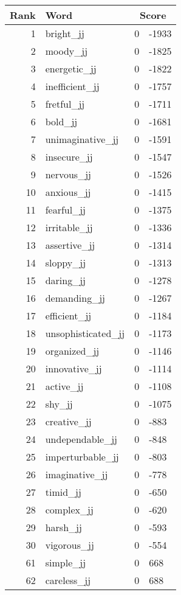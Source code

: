 \begin{longtable}[!htbp]{| rlr@{.}l |}
    \hline
    \textbf{Rank} & \textbf{Word} & \multicolumn{2}{c|}{\textbf{Score}} \\
    \hline
    \endhead
    1 & bright\_jj & 0 & -1933 \\
    2 & moody\_jj & 0 & -1825 \\
    3 & energetic\_jj & 0 & -1822 \\
    4 & inefficient\_jj & 0 & -1757 \\
    5 & fretful\_jj & 0 & -1711 \\
    6 & bold\_jj & 0 & -1681 \\
    7 & unimaginative\_jj & 0 & -1591 \\
    8 & insecure\_jj & 0 & -1547 \\
    9 & nervous\_jj & 0 & -1526 \\
    10 & anxious\_jj & 0 & -1415 \\
    11 & fearful\_jj & 0 & -1375 \\
    12 & irritable\_jj & 0 & -1336 \\
    13 & assertive\_jj & 0 & -1314 \\
    14 & sloppy\_jj & 0 & -1313 \\
    15 & daring\_jj & 0 & -1278 \\
    16 & demanding\_jj & 0 & -1267 \\
    17 & efficient\_jj & 0 & -1184 \\
    18 & unsophisticated\_jj & 0 & -1173 \\
    19 & organized\_jj & 0 & -1146 \\
    20 & innovative\_jj & 0 & -1114 \\
    21 & active\_jj & 0 & -1108 \\
    22 & shy\_jj & 0 & -1075 \\
    23 & creative\_jj & 0 & -883 \\
    24 & undependable\_jj & 0 & -848 \\
    25 & imperturbable\_jj & 0 & -803 \\
    26 & imaginative\_jj & 0 & -778 \\
    27 & timid\_jj & 0 & -650 \\
    28 & complex\_jj & 0 & -620 \\
    29 & harsh\_jj & 0 & -593 \\
    30 & vigorous\_jj & 0 & -554 \\
    61 & simple\_jj & 0 & 668 \\
    62 & careless\_jj & 0 & 688 \\

\end{longtable}
